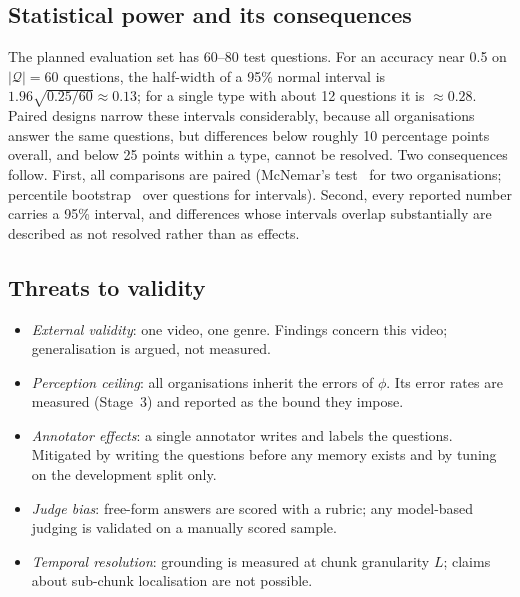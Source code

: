 \subsection{Statistical power and its consequences}\label{sec:power}
The planned evaluation set has 60--80 test questions. For an accuracy near
0.5 on $|\mathcal Q|=60$ questions, the half-width of a 95\% normal interval is
$1.96\sqrt{0.25/60}\approx 0.13$; for a single type with about 12 questions it
is $\approx 0.28$. Paired designs narrow these intervals considerably, because
all organisations answer the same questions, but differences below roughly
10 percentage points overall, and below 25 points within a type, cannot be
resolved. Two consequences follow. First, all comparisons are paired
(McNemar's test~\citep{mcnemar1947} for two organisations; percentile
bootstrap~\citep{efron1993bootstrap} over questions for intervals). Second,
every reported number carries a 95\% interval, and differences whose intervals
overlap substantially are described as not resolved rather than as effects.

\subsection{Threats to validity}\label{sec:threats}
\begin{itemize}[nosep]
  \item \emph{External validity}: one video, one genre. Findings concern this
        video; generalisation is argued, not measured.
  \item \emph{Perception ceiling}: all organisations inherit the errors of
        $\phi$. Its error rates are measured (Stage~3) and reported as the
        bound they impose.
  \item \emph{Annotator effects}: a single annotator writes and labels the
        questions. Mitigated by writing the questions before any memory
        exists and by tuning on the development split only.
  \item \emph{Judge bias}: free-form answers are scored with a rubric; any
        model-based judging is validated on a manually scored sample.
  \item \emph{Temporal resolution}: grounding is measured at chunk
        granularity $L$; claims about sub-chunk localisation are not possible.
\end{itemize}
